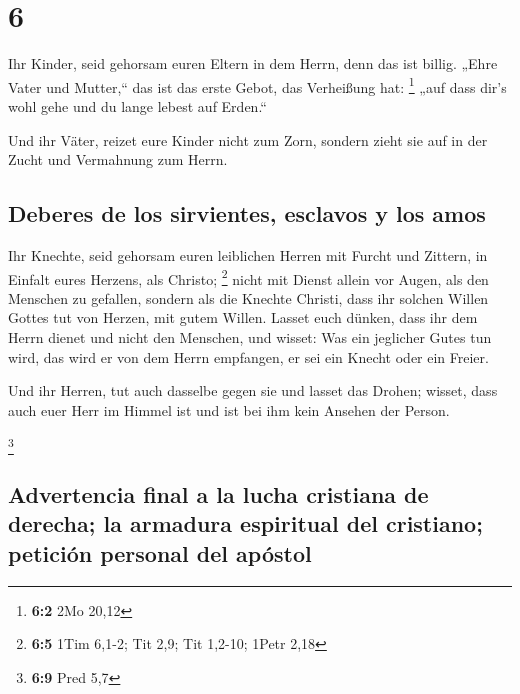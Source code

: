 \hypertarget{section-5}{%
\section{6}\label{section-5}}

 Ihr Kinder, seid gehorsam euren Eltern in dem Herrn, denn
das ist billig.  „Ehre Vater und Mutter,`` das ist das
erste Gebot, das Verheißung hat: \footnote{\textbf{6:2} 2Mo 20,12}
 „auf dass dir's wohl gehe und du lange lebest auf
Erden.``

 Und ihr Väter, reizet eure Kinder nicht zum Zorn, sondern
zieht sie auf in der Zucht und Vermahnung zum Herrn.

\hypertarget{deberes-de-los-sirvientes-esclavos-y-los-amos}{%
\subsection{Deberes de los sirvientes, esclavos y los
amos}\label{deberes-de-los-sirvientes-esclavos-y-los-amos}}

 Ihr Knechte, seid gehorsam euren leiblichen Herren mit
Furcht und Zittern, in Einfalt eures Herzens, als Christo; \footnote{\textbf{6:5}
  1Tim 6,1-2; Tit 2,9; Tit 1,2-10; 1Petr 2,18}  nicht mit
Dienst allein vor Augen, als den Menschen zu gefallen, sondern als die
Knechte Christi, dass ihr solchen Willen Gottes tut von Herzen, mit
gutem Willen.  Lasset euch dünken, dass ihr dem Herrn
dienet und nicht den Menschen,  und wisset: Was ein
jeglicher Gutes tun wird, das wird er von dem Herrn empfangen, er sei
ein Knecht oder ein Freier.

 Und ihr Herren, tut auch dasselbe gegen sie und lasset
das Drohen; wisset, dass auch euer Herr im Himmel ist und ist bei ihm
kein Ansehen der Person.

\footnote{\textbf{6:9} Pred 5,7}

\hypertarget{advertencia-final-a-la-lucha-cristiana-de-derecha-la-armadura-espiritual-del-cristiano-peticiuxf3n-personal-del-apuxf3stol}{%
\subsection{Advertencia final a la lucha cristiana de derecha; la
armadura espiritual del cristiano; petición personal del
apóstol}\label{advertencia-final-a-la-lucha-cristiana-de-derecha-la-armadura-espiritual-del-cristiano-peticiuxf3n-personal-del-apuxf3stol}}

